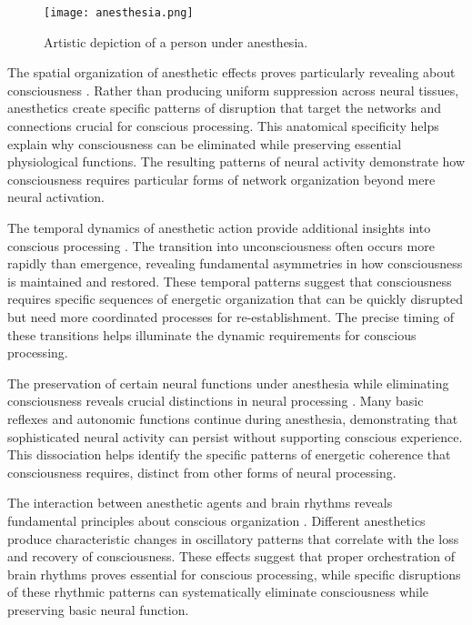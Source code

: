 \begin{refsection}
\begin{figure}[h]
    \centering
    \texttt{[image: anesthesia.png]}

    \caption{Artistic depiction of a person under anesthesia. }
\end{figure}

The spatial organization of anesthetic effects proves particularly revealing about consciousness \cite{Lewis2012}. Rather than producing uniform suppression across neural tissues, anesthetics create specific patterns of disruption that target the networks and connections crucial for conscious processing. This anatomical specificity helps explain why consciousness can be eliminated while preserving essential physiological functions. The resulting patterns of neural activity demonstrate how consciousness requires particular forms of network organization beyond mere neural activation.

The temporal dynamics of anesthetic action provide additional insights into conscious processing \cite{Purdon2013}. The transition into unconsciousness often occurs more rapidly than emergence, revealing fundamental asymmetries in how consciousness is maintained and restored. These temporal patterns suggest that consciousness requires specific sequences of energetic organization that can be quickly disrupted but need more coordinated processes for re-establishment. The precise timing of these transitions helps illuminate the dynamic requirements for conscious processing.

The preservation of certain neural functions under anesthesia while eliminating consciousness reveals crucial distinctions in neural processing \cite{Sanders2012}. Many basic reflexes and autonomic functions continue during anesthesia, demonstrating that sophisticated neural activity can persist without supporting conscious experience. This dissociation helps identify the specific patterns of energetic coherence that consciousness requires, distinct from other forms of neural processing.

The interaction between anesthetic agents and brain rhythms reveals fundamental principles about conscious organization \cite{Steriade2003}. Different anesthetics produce characteristic changes in oscillatory patterns that correlate with the loss and recovery of consciousness. These effects suggest that proper orchestration of brain rhythms proves essential for conscious processing, while specific disruptions of these rhythmic patterns can systematically eliminate consciousness while preserving basic neural function.


\end{refsection}
